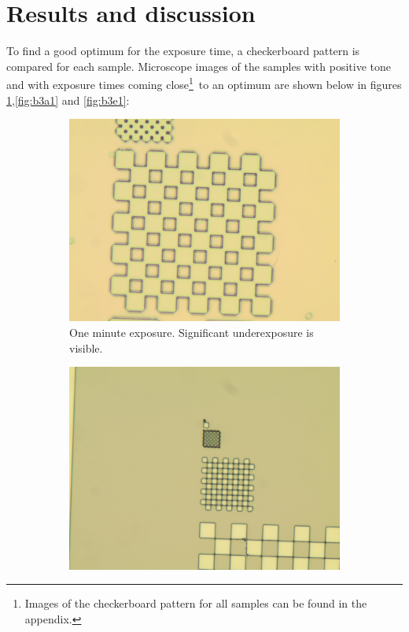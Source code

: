 \section*{Results and discussion}
To find a good optimum for the exposure time, a checkerboard pattern is compared for each sample. Microscope images of the samples with positive tone and with exposure times coming close\footnote{Images of the checkerboard pattern for all samples can be found in the appendix.}~to an optimum are shown  below in figures \ref{fig:b3d1},\ref{fig:b3a1} and \ref{fig:b3e1}:

\begin{figure}[ht]
    \centering
    \begin{subfigure}[t]{0.3\linewidth}
        \centering
        \includegraphics[width=\textwidth]{data/b3d1.jpg}
        \caption{One minute exposure. Significant underexposure is visible.}
        \label{fig:b3d1}
    \end{subfigure}
    \hfill
    \begin{subfigure}[t]{0.3\linewidth}
        \centering
        \includegraphics[width=\textwidth]{data/b3a1.jpg}

\end{subfigure}
\end{figure}
